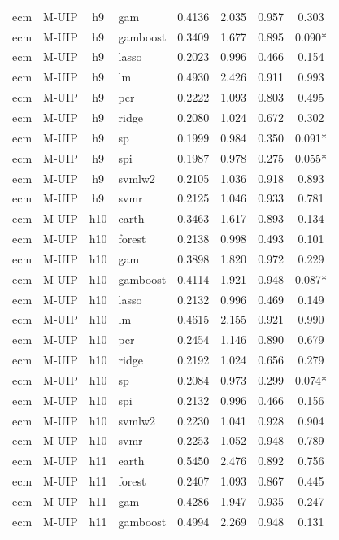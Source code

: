 \begin{ThreePartTable}
\begin{longtable}[t]{llclcccc}
ecm & M-UIP & h9 & gam & 0.4136 & 2.035 & 0.957 & 0.303\\
ecm & M-UIP & h9 & gamboost & 0.3409 & 1.677 & 0.895 & 0.090*\\
ecm & M-UIP & h9 & lasso & 0.2023 & 0.996 & 0.466 & 0.154\\
ecm & M-UIP & h9 & lm & 0.4930 & 2.426 & 0.911 & 0.993\\
ecm & M-UIP & h9 & pcr & 0.2222 & 1.093 & 0.803 & 0.495\\
ecm & M-UIP & h9 & ridge & 0.2080 & 1.024 & 0.672 & 0.302\\
ecm & M-UIP & h9 & sp & 0.1999 & 0.984 & 0.350 & 0.091*\\
ecm & M-UIP & h9 & spi & 0.1987 & 0.978 & 0.275 & 0.055*\\
ecm & M-UIP & h9 & svmlw2 & 0.2105 & 1.036 & 0.918 & 0.893\\
ecm & M-UIP & h9 & svmr & 0.2125 & 1.046 & 0.933 & 0.781\\
\addlinespace
ecm & M-UIP & h10 & earth & 0.3463 & 1.617 & 0.893 & 0.134\\
ecm & M-UIP & h10 & forest & 0.2138 & 0.998 & 0.493 & 0.101\\
ecm & M-UIP & h10 & gam & 0.3898 & 1.820 & 0.972 & 0.229\\
ecm & M-UIP & h10 & gamboost & 0.4114 & 1.921 & 0.948 & 0.087*\\
ecm & M-UIP & h10 & lasso & 0.2132 & 0.996 & 0.469 & 0.149\\
ecm & M-UIP & h10 & lm & 0.4615 & 2.155 & 0.921 & 0.990\\
ecm & M-UIP & h10 & pcr & 0.2454 & 1.146 & 0.890 & 0.679\\
ecm & M-UIP & h10 & ridge & 0.2192 & 1.024 & 0.656 & 0.279\\
ecm & M-UIP & h10 & sp & 0.2084 & 0.973 & 0.299 & 0.074*\\
ecm & M-UIP & h10 & spi & 0.2132 & 0.996 & 0.466 & 0.156\\
ecm & M-UIP & h10 & svmlw2 & 0.2230 & 1.041 & 0.928 & 0.904\\
ecm & M-UIP & h10 & svmr & 0.2253 & 1.052 & 0.948 & 0.789\\
\addlinespace
ecm & M-UIP & h11 & earth & 0.5450 & 2.476 & 0.892 & 0.756\\
ecm & M-UIP & h11 & forest & 0.2407 & 1.093 & 0.867 & 0.445\\
ecm & M-UIP & h11 & gam & 0.4286 & 1.947 & 0.935 & 0.247\\
ecm & M-UIP & h11 & gamboost & 0.4994 & 2.269 & 0.948 & 0.131\\

\end{longtable}
\end{ThreePartTable}

